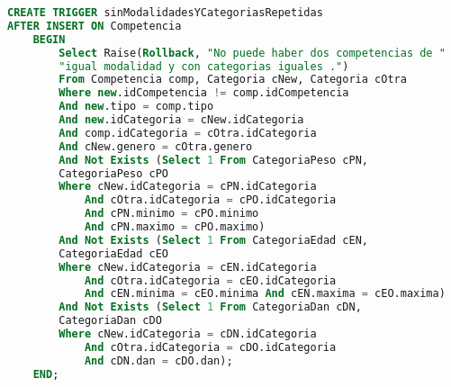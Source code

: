 \begin{lstlisting}[language=SQL]
CREATE TRIGGER sinModalidadesYCategoriasRepetidas 
AFTER INSERT ON Competencia
    BEGIN
        Select Raise(Rollback, "No puede haber dos competencias de "
        "igual modalidad y con categorias iguales .")
        From Competencia comp, Categoria cNew, Categoria cOtra
        Where new.idCompetencia != comp.idCompetencia 
        And new.tipo = comp.tipo 
        And new.idCategoria = cNew.idCategoria 
        And comp.idCategoria = cOtra.idCategoria 
        And cNew.genero = cOtra.genero
        And Not Exists (Select 1 From CategoriaPeso cPN, 
        CategoriaPeso cPO 
        Where cNew.idCategoria = cPN.idCategoria 
            And cOtra.idCategoria = cPO.idCategoria 
            And cPN.minimo = cPO.minimo 
            And cPN.maximo = cPO.maximo)
        And Not Exists (Select 1 From CategoriaEdad cEN, 
        CategoriaEdad cEO 
        Where cNew.idCategoria = cEN.idCategoria 
            And cOtra.idCategoria = cEO.idCategoria 
            And cEN.minima = cEO.minima And cEN.maxima = cEO.maxima)
        And Not Exists (Select 1 From CategoriaDan cDN, 
        CategoriaDan cDO 
        Where cNew.idCategoria = cDN.idCategoria 
            And cOtra.idCategoria = cDO.idCategoria 
            And cDN.dan = cDO.dan);
    END;
\end{lstlisting}
